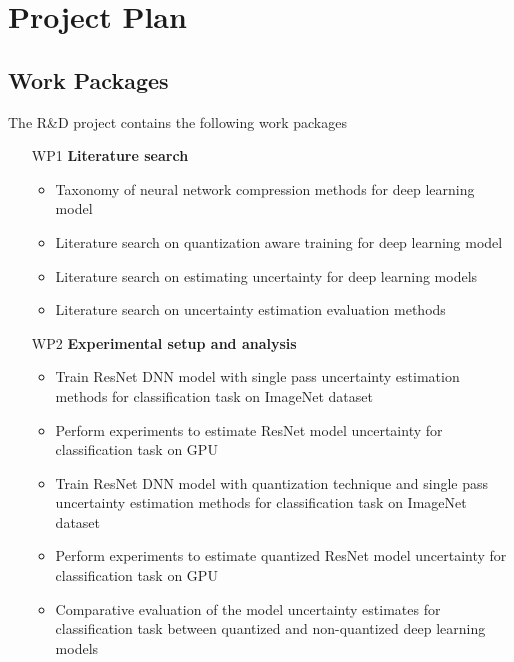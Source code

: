 \documentclass[rnd]{mas_proposal}
\begin{document}
\section{Project Plan}
\subsection{Work Packages}
The R\&D project contains the following work packages
\begin{enumerate}
    \item[WP1] \textbf{Literature search}
        \begin{itemize}
        \item Taxonomy of neural network compression methods for deep learning model
        \item Literature search on quantization aware training for deep learning model
        \item Literature search on estimating uncertainty for deep learning models
        \item Literature search on uncertainty estimation evaluation methods
        \end{itemize}

    \item[WP2] \textbf{Experimental setup and analysis}
        \begin{itemize}
        \item Train ResNet\cite{he2016deep} DNN model with single pass uncertainty estimation methods for classification task on ImageNet\cite{russakovsky2015imagenet} dataset
        \item Perform experiments to estimate ResNet model uncertainty for classification task on GPU
        \item Train ResNet DNN model with quantization technique and single pass uncertainty estimation methods for classification task on ImageNet dataset
        \item Perform experiments to estimate quantized ResNet model uncertainty for classification task on GPU
        \item Comparative evaluation of the model uncertainty estimates for classification task between quantized and non-quantized deep learning models
        \end{itemize}
        

\end{enumerate}
\end{document}
